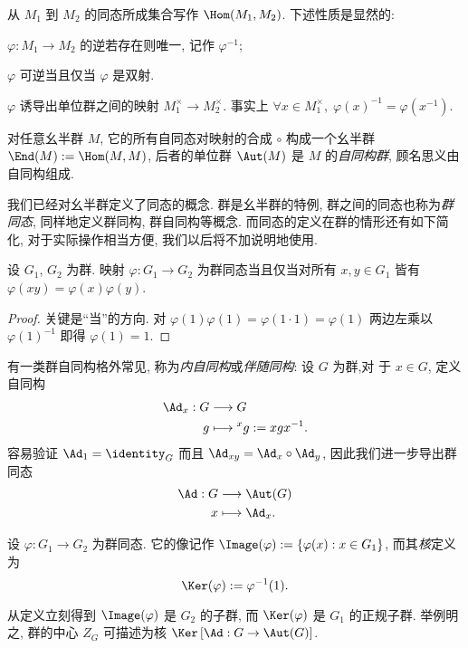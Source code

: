 从 $M_1$ 到 $M_2$ 的同态所成集合写作 $\Hom(M_1, M_2)$. 下述性质是显然的:
\begin{compactitem}
	\item $\varphi: M_1 \to M_2$ 的逆若存在则唯一, 记作 $\varphi^{-1}$;
	\item $\varphi$ 可逆当且仅当 $\varphi$ 是双射.
	\item $\varphi$ 诱导出单位群之间的映射 $M_1^\times \to M_2^\times$. 事实上 $\forall x \in M_1^\times, \;\varphi(x)^{-1} = \varphi(x^{-1})$.
	\item 对任意幺半群 $M$, 它的所有自同态对映射的合成 $\circ$ 构成一个幺半群 $\End(M) := \Hom(M, M)$, 后者的单位群 $\Aut(M)$ 是 $M$ 的\emph{自同构群}, 顾名思义由自同构组成.
\end{compactitem}

我们已经对幺半群定义了同态的概念. 群是幺半群的特例, 群之间的同态也称为\emph{群同态}, 同样地定义群同构, 群自同构等概念. 而同态的定义在群的情形还有如下简化, 对于实际操作相当方便, 我们以后将不加说明地使用.
\begin{proposition}
	设 $G_1$, $G_2$ 为群. 映射 $\varphi: G_1 \to G_2$ 为群同态当且仅当对所有 $x, y \in G_1$ 皆有 $\varphi(xy)=\varphi(x)\varphi(y)$.
\end{proposition}
\begin{proof}
	关键是``当''的方向. 对 $\varphi(1)\varphi(1) = \varphi(1 \cdot 1) = \varphi(1)$ 两边左乘以 $\varphi(1)^{-1}$ 即得 $\varphi(1) = 1$.
\end{proof}

有一类群自同构格外常见, 称为\emph{内自同构}或\emph{伴随同构}: 设 $G$ 为群,对 于 $x \in G$, 定义自同构
\begin{align*}
	\Ad_x: G & \longrightarrow G \\
	g & \longmapsto {}^x g := xgx^{-1}.
\end{align*}
容易验证 $\Ad_1 = \identity_G$ 而且 $\Ad_{xy} = \Ad_x \circ \Ad_y$, 因此我们进一步导出群同态
\begin{align*}
	\Ad: G & \longrightarrow \Aut(G) \\
	x & \longmapsto \Ad_x.
\end{align*}

\begin{definition}
	设 $\varphi: G_1 \to G_2$ 为群同态. 它的像记作 $\Image(\varphi) := \{\varphi(x) : x \in G_1\}$, 而其\emph{核}定义为 
	\[ \Ker(\varphi) := \varphi^{-1}(1). \]
\end{definition}
从定义立刻得到 $\Image(\varphi)$ 是 $G_2$ 的子群, 而 $\Ker(\varphi)$ 是 $G_1$ 的正规子群. 举例明之, 群的中心 $Z_G$ 可描述为核 $\Ker\left[ \Ad: G \to \Aut(G) \right]$.

